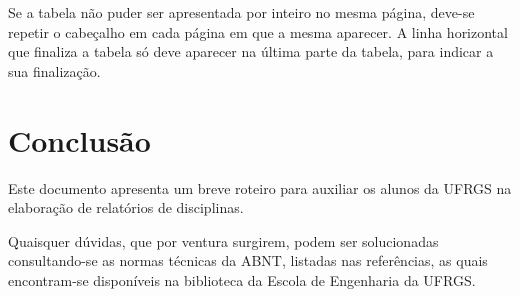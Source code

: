 \documentclass[repeatfields,xlists,xpacks,oneside]{ufrgscca}
\begin{document}
Se a tabela não puder ser apresentada por inteiro no mesma página, deve-se
repetir o cabeçalho em cada página em que a mesma aparecer. A linha horizontal que
finaliza a tabela só deve aparecer na última parte da tabela, para indicar a
sua finalização.


\chapter{Conclusão}
\label{conclusao}

Este documento apresenta um breve roteiro para auxiliar os
alunos da UFRGS na elaboração de relatórios de disciplinas.

Quaisquer dúvidas, que por ventura surgirem, podem ser solucionadas
consultando-se as normas técnicas da ABNT, listadas nas referências, as
quais encontram-se disponíveis na biblioteca da Escola de Engenharia da
UFRGS.


\printbibliography
\end{document}
